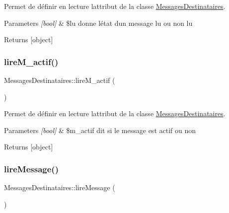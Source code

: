 Permet de définir en lecture l\textquotesingle{}attribut de la classe \hyperlink{class_messages_destinataires}{Messages\+Destinataires}. 


\begin{DoxyParams}{Parameters}
{\em \mbox{[}bool\mbox{]}} & \$lu donne l\textquotesingle{}état d\textquotesingle{}un message lu ou non lu \\
\hline
\end{DoxyParams}
\begin{DoxyReturn}{Returns}
\mbox{[}object\mbox{]} 
\end{DoxyReturn}
\mbox{\label{class_messages_destinataires_a9835a1106bc78c6b24e6007d6537f03f}} 
\subsubsection{\texorpdfstring{lire\+M\+\_\+actif()}{lireM\_actif()}}
{\footnotesize\ttfamily Messages\+Destinataires\+::lire\+M\+\_\+actif (\begin{DoxyParamCaption}{ }\end{DoxyParamCaption})}



Permet de définir en lecture l\textquotesingle{}attribut de la classe \hyperlink{class_messages_destinataires}{Messages\+Destinataires}. 


\begin{DoxyParams}{Parameters}
{\em \mbox{[}bool\mbox{]}} & \$m\+\_\+actif dit si le message est actif ou non \\
\hline
\end{DoxyParams}
\begin{DoxyReturn}{Returns}
\mbox{[}object\mbox{]} 
\end{DoxyReturn}
\mbox{\label{class_messages_destinataires_afcc38aa5611e45d02c271c56bf866a46}} 
\subsubsection{\texorpdfstring{lire\+Message()}{lireMessage()}}
{\footnotesize\ttfamily Messages\+Destinataires\+::lire\+Message (\begin{DoxyParamCaption}{ }\end{DoxyParamCaption})}




